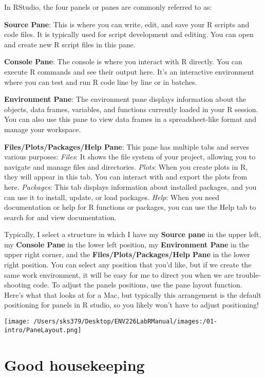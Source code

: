 \documentclass[
]{book}
\begin{document}
In RStudio, the four panels or panes are commonly referred to as:

\textbf{Source Pane}: This is where you can write, edit, and save your R scripts and code files. It is typically used for script development and editing. You can open and create new R script files in this pane.

\textbf{Console Pane}: The console is where you interact with R directly. You can execute R commands and see their output here. It's an interactive environment where you can test and run R code line by line or in batches.

\textbf{Environment Pane}: The environment pane displays information about the objects, data frames, variables, and functions currently loaded in your R session. You can also use this pane to view data frames in a spreadsheet-like format and manage your workspace.

\textbf{Files/Plots/Packages/Help Pane}: This pane has multiple tabs and serves various purposes:
\emph{Files}: It shows the file system of your project, allowing you to navigate and manage files and directories.
\emph{Plots}: When you create plots in R, they will appear in this tab. You can interact with and export the plots from here.
\emph{Packages}: This tab displays information about installed packages, and you can use it to install, update, or load packages.
\emph{Help}: When you need documentation or help for R functions or packages, you can use the Help tab to search for and view documentation.

Typically, I select a structure in which I have my \textbf{Source pane} in the upper left, my \textbf{Console Pane} in the lower left position, my \textbf{Environment Pane} in the upper right corner, and the \textbf{Files/Plots/Packages/Help Pane} in the lower right position. You can select any position that you'd like, but if we create the same work environment, it will be easy for me to direct you when we are trouble-shooting code. To adjust the panels positions, use the pane layout function. Here's what that looks at for a Mac, but typically this arrangement is the default positioning for panels in R studio, so you likely won't have to adjust positioning!

\texttt{[image: /Users/sks379/Desktop/ENV226LabRManual/images:/01-intro/PaneLayout.png]}

\hypertarget{good-housekeeping}{%
\section{Good housekeeping}\label{good-housekeeping}}
\end{document}
